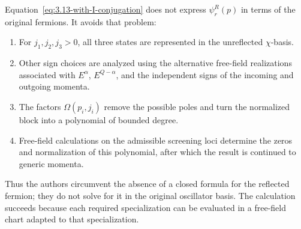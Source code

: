 \documentclass[11pt]{article}
\begin{document}
Equation~\eqref{eq:3.13-with-I-conjugation} does not express
\(\psi_r^R(p)\) in terms of the original fermions.  It avoids that problem:
\begin{enumerate}
 \item For \(j_1,j_2,j_3>0\), all three states are represented in the
       unreflected \(\chi\)-basis.
 \item Other sign choices are analyzed using the alternative free-field
       realizations associated with \(E^{\alpha}\), \(E^{Q-\alpha}\), and
       the independent signs of the incoming and outgoing momenta.
 \item The factors \(\Omega(p_i,j_i)\) remove the possible poles and turn
       the normalized block into a polynomial of bounded degree.
 \item Free-field calculations on the admissible screening loci determine
       the zeros and normalization of this polynomial, after which the
       result is continued to generic momenta.
\end{enumerate}
Thus the authors circumvent the absence of a closed formula for the
reflected fermion; they do not solve for it in the original oscillator
basis.  The calculation succeeds because each required specialization can
be evaluated in a free-field chart adapted to that specialization.
\end{document}
